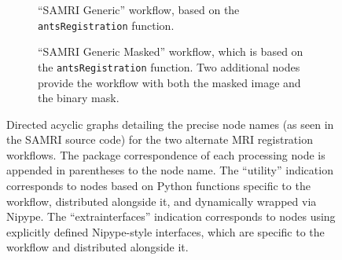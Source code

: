 \begin{figure}[h!]
	\begin{subfigure}{0.48\textwidth}
		\centering
		\vspace{1.4em}
		\caption{
			“SAMRI Generic”  workflow, based on the \textcolor{mg}{\texttt{antsRegistration}} function.
		}
		\label{fig:nwfgg}
	\end{subfigure}
		\begin{subfigure}{0.48\textwidth}
		\centering
		\vspace{-1.9em}
		\caption{
			“SAMRI Generic Masked” workflow, which is based on the \textcolor{mg}{\texttt{antsRegistration}} function. Two additional nodes provide the workflow with both the masked image and the binary mask.
			}
		\label{fig:nwfgl}
	\end{subfigure}\hfill
	\caption{
		Directed acyclic graphs detailing the precise node names (as seen in the SAMRI source code) for the two alternate MRI registration workflows.
		The package correspondence of each processing node is appended in parentheses to the node name.
		The “utility” indication corresponds to nodes based on Python functions specific to the workflow, distributed alongside it, and dynamically wrapped via Nipype.
		The “extra\niceus interfaces” indication corresponds to nodes using explicitly defined Nipype-style interfaces, which are specific to the workflow and distributed alongside it.
		}
	\label{fig:nwfg}
\end{figure}


